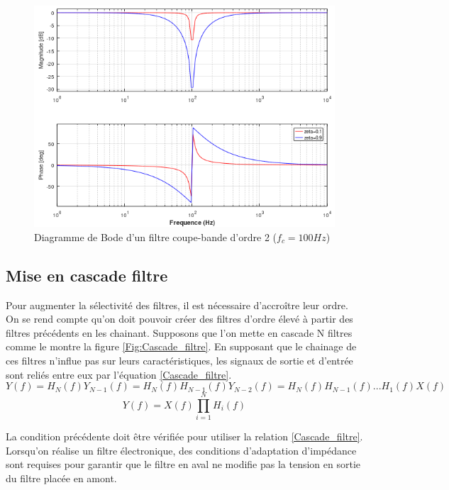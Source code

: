 	\begin{figure}[h!]
		\centering
		\includegraphics[scale=0.75]{images/Bode_coupe_bande.png}
		\caption{Diagramme de Bode d'un filtre coupe-bande d'ordre 2 ($f_{c}=100 Hz$)}	
		\label{Fig:Bode_coupe_bande} 
	\end{figure}
	
	\subsection{Mise en cascade filtre}
	
	Pour augmenter la sélectivité des filtres, il est nécessaire d'accroître leur ordre. On se rend compte qu'on doit pouvoir créer des filtres d'ordre élevé à partir des filtres précédents en les chainant. Supposons que l'on mette en cascade N filtres comme le montre la figure \ref{Fig:Cascade_filtre}. En supposant que le chainage de ces filtres n'influe pas sur leurs caractéristiques, les signaux de sortie et d'entrée sont reliés entre eux par l'équation \ref{Cascade_filtre}.
	\begin{equation*}
	Y(f)=H_{N}(f)Y_{N-1}(f)=H_{N}(f)H_{N-1}(f)Y_{N-2}(f)=H_{N}(f)H_{N-1}(f)...H_{1}(f)X(f)
	\end{equation*}
	\begin{equation}\label{Cascade_filtre}
	Y(f)=X(f)\prod_{i=1}^{N}H_{i}(f)
	\end{equation}
	
	
	
	La condition précédente doit être vérifiée pour utiliser la relation \ref{Cascade_filtre}. Lorsqu'on réalise un filtre électronique, des conditions d'adaptation d'impédance sont requises pour garantir que le filtre en aval ne modifie pas la tension en sortie du filtre placée en amont. 
	
